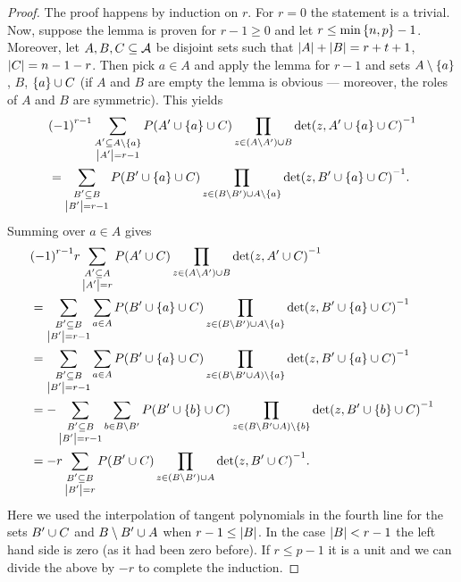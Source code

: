 \begin{proof}
    The proof happens by induction on $r$. For $r=0$ the statement is a
    trivial.
    Now, suppose the lemma is proven for $r-1\geq 0$ and let
    $r\leq\min\set{n,p}-1$.
    Moreover, let $A,B,C\subseteq \mathcal{A}$ be disjoint sets such
    that $\left\vert{A}\right\vert+\left\vert{B}\right\vert=r+t+1$, $\left\vert{C}\right\vert=n-1-r$. Then pick $a\in A$ and
    apply the lemma for $r-1$ and sets $A\setminus\set a$, $B$,
    $\set{a}\setjoin C$ (if $A$ and $B$ are empty the lemma is obvious --- moreover, the roles of $A$ and $B$ are symmetric).
    This yields
    \begin{align*}
        &{(-1)}^{r-1}\sum_{\substack{A'\setleq A\setminus\set a\\ \card{A'}=r-1}}{P(A'\setjoin\set a\setjoin C)\prod_{z\in (A\setminus A')\setjoin B}{{\det(z,A'\setjoin\set a\setjoin C)}^{-1}}}\\
        &= \sum_{\substack{B'\setleq B\\ \card{B'}=r-1}}{P(B'\setjoin\set a\setjoin C)\prod_{z\in (B\setminus B')\setjoin A\setminus\set a}{{\det(z,B'\setjoin\set a\setjoin C)}^{-1}}}\text{.}
    \end{align*}
    Summing over $a\in A$ gives
    \begin{align*}
        &{(-1)}^{r-1}r\sum_{\substack{A'\setleq A\\ \card{A'}=r}}{P(A'\setjoin C)\prod_{z\in (A\setminus A')\setjoin B}{{\det(z,A'\setjoin C)}^{-1}}}\\
        &= \sum_{\substack{B'\setleq B\\ \card{B'}=r-1}}{\sum_{a\in A}{P(B'\setjoin\set a\setjoin C)\prod_{z\in (B\setminus B')\setjoin A\setminus\set a}{{\det(z,B'\setjoin\set a\setjoin C)}^{-1}}}}\\
        &= \sum_{\substack{B'\setleq B\\ \card{B'}=r-1}}{\sum_{a\in A}{P(B'\setjoin\set a\setjoin C)\prod_{z\in (B\setminus B'\setjoin A)\setminus\set a}{{\det(z,B'\setjoin\set a\setjoin C)}^{-1}}}}\\
        &= -\sum_{\substack{B'\setleq B\\ \card{B'}=r-1}}{\sum_{b\in B\setminus B'}{P(B'\setjoin\set b\setjoin C)\prod_{z\in(B\setminus B'\setjoin A)\setminus\set b}{{\det(z,B'\setjoin\set b\setjoin C)}^{-1}}}}\\
        &= -r\sum_{\substack{B'\setleq B\\ \card{B'}=r}}{P(B'\setjoin C)\prod_{z\in (B\setminus B')\setjoin A}{{\det(z,B'\setjoin C)}^{-1}}}\text{.}
    \end{align*}
    Here we used the interpolation of tangent polynomials in the fourth
    line for the sets $B'\cup C$ and $B\setminus B'\cup A$ when
    $r-1\leq\left\vert{B}\right\vert$. In the case $\left\vert{B}\right\vert< r-1$ the left hand side is zero (as it
    had been zero before).
    If $r\leq p-1$ it is a unit and we can divide the above by $-r$ to complete
    the induction.
\end{proof}


